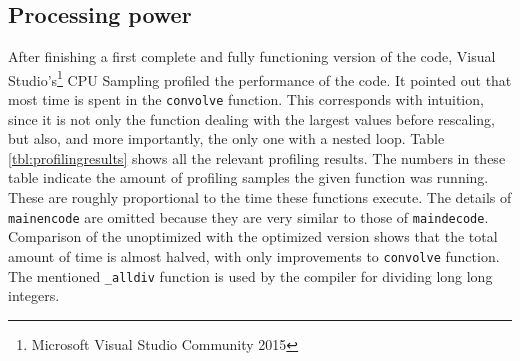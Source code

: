 \documentclass[a4paper]{article}
\begin{document}
\subsection{Processing power} 
After finishing a first complete and fully functioning version of the code, Visual Studio's\footnote{Microsoft Visual Studio Community 2015} CPU Sampling profiled the performance of the code. It pointed out that most time is spent in the \texttt{convolve} function. This corresponds with intuition, since it is not only the function dealing with the largest values before rescaling, but also, and more importantly, the only one with a nested loop. Table \ref{tbl:profilingresults} shows all the relevant profiling results. The numbers in these table indicate the amount of profiling samples the given function was running. These are roughly proportional to the time these functions execute. The details of \texttt{mainencode} are omitted because they are very similar to those of \texttt{maindecode}. Comparison of the unoptimized with the optimized version shows that the total amount of time is almost halved, with only improvements to \texttt{convolve} function. The mentioned \texttt{\_alldiv} function is used by the compiler for dividing long long integers.\\
\end{document}
